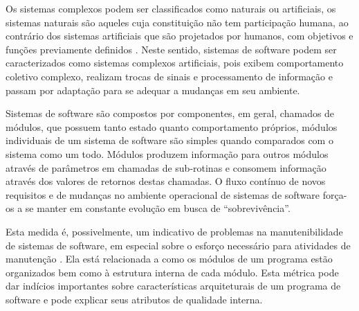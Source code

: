 Os sistemas complexos podem ser classificados como naturais ou artificiais, os
sistemas naturais são aqueles cuja constituição não tem participação humana, ao
contrário dos sistemas artificiais que são projetados por humanos, com
objetivos e funções previamente definidos \cite{Simon1996}. Neste sentido,
sistemas de software podem ser caracterizados como sistemas complexos
artificiais, pois exibem comportamento coletivo complexo, realizam trocas de
sinais e processamento de informação e passam por adaptação para se adequar a
mudanças em seu ambiente.

Sistemas de software são compostos por componentes, em geral, chamados de
módulos, que possuem tanto estado quanto comportamento próprios,
módulos individuais de um sistema de software são simples quando comparados com
o sistema como um todo. Módulos produzem informação para outros módulos
através de parâmetros em chamadas de sub-rotinas e consomem informação através
dos valores de retornos destas chamadas. O fluxo contínuo de novos requisitos e
de mudanças no ambiente operacional de sistemas de software força-os a se
manter em constante evolução em busca de “sobrevivência”.

Esta medida é, possivelmente, um indicativo de problemas na manutenibilidade de
sistemas de software, em especial sobre o esforço necessário para atividades de
manutenção \cite{Terceiro2012}. Ela está relacionada a como os módulos de um
programa estão organizados bem como à estrutura interna de cada módulo. Esta
métrica pode dar indícios importantes sobre características arquiteturais de um
programa de software e pode explicar seus atributos de qualidade interna.



